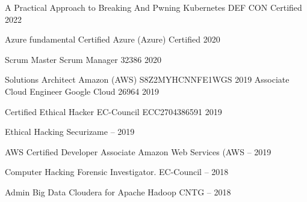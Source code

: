 \begin{cvhonors}
  \cvhonor
    {A Practical Approach to Breaking And Pwning Kubernetes} %
    {DEF CON} %
    {Certified} %
    {2022} %
    
  \cvhonor
    {Azure fundamental Certified} %
    {Azure (Azure)} %
    {Certified} %
    {2020} %
    
  \cvhonor
    {Scrum Master} %
    {Scrum Manager} %
    {32386} %
    {2020} %

  \cvhonor
    {Solutions Architect } %
    {Amazon (AWS)} %
    {S8Z2MYHCNNFE1WGS} %
    {2019} %
  \cvhonor
    {Associate Cloud Engineer} %
    {Google Cloud} %
    {26964} %
    {2019} %
    
  \cvhonor
    {Certified Ethical Hacker } %
    {EC-Council} %
    {ECC2704386591} %
    {2019} %
    
  \cvhonor
    {Ethical Hacking} %
    {Securizame} %
    { -- } %
    {2019} %
    
  \cvhonor
    {AWS Certified Developer Associate} %
    {Amazon Web Services (AWS} %
    { -- } %
    {2019} %
    
  \cvhonor
    {Computer Hacking Forensic Investigator.} %
    {EC-Council } %
    { -- } %
    {2018} %
    
  \cvhonor
    {Admin Big Data Cloudera for Apache Hadoop} %
    {CNTG } %
    { -- } %
    {2018} %


\end{cvhonors}
